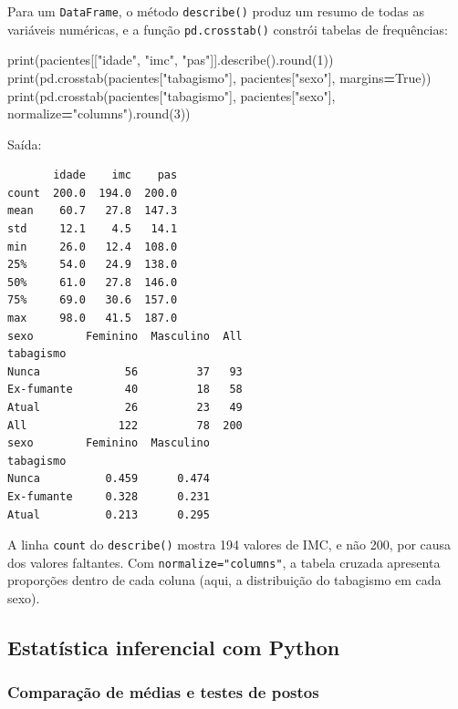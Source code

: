 \documentclass[
]{book}
\newenvironment{Shaded}{\begin{snugshade}}{\end{snugshade}}
\newcommand{\BuiltInTok}[1]{#1}
\newcommand{\DecValTok}[1]{\textcolor[rgb]{0.00,0.00,0.81}{#1}}
\newcommand{\NormalTok}[1]{#1}
\newcommand{\OperatorTok}[1]{\textcolor[rgb]{0.81,0.36,0.00}{\textbf{#1}}}
\newcommand{\StringTok}[1]{\textcolor[rgb]{0.31,0.60,0.02}{#1}}
\newcommand{\VariableTok}[1]{\textcolor[rgb]{0.00,0.00,0.00}{#1}}
\begin{document}
Para um \texttt{DataFrame}, o método \texttt{describe()} produz um resumo de todas as variáveis numéricas, e a função \texttt{pd.crosstab()} constrói tabelas de frequências:

\begin{Shaded}
\begin{Highlighting}[]
\BuiltInTok{print}\NormalTok{(pacientes[[}\StringTok{"idade"}\NormalTok{, }\StringTok{"imc"}\NormalTok{, }\StringTok{"pas"}\NormalTok{]].describe().}\BuiltInTok{round}\NormalTok{(}\DecValTok{1}\NormalTok{))}
\BuiltInTok{print}\NormalTok{(pd.crosstab(pacientes[}\StringTok{"tabagismo"}\NormalTok{], pacientes[}\StringTok{"sexo"}\NormalTok{], margins}\OperatorTok{=}\VariableTok{True}\NormalTok{))}
\BuiltInTok{print}\NormalTok{(pd.crosstab(pacientes[}\StringTok{"tabagismo"}\NormalTok{], pacientes[}\StringTok{"sexo"}\NormalTok{], normalize}\OperatorTok{=}\StringTok{"columns"}\NormalTok{).}\BuiltInTok{round}\NormalTok{(}\DecValTok{3}\NormalTok{))}
\end{Highlighting}
\end{Shaded}

Saída:

\begin{verbatim}
       idade    imc    pas
count  200.0  194.0  200.0
mean    60.7   27.8  147.3
std     12.1    4.5   14.1
min     26.0   12.4  108.0
25%     54.0   24.9  138.0
50%     61.0   27.8  146.0
75%     69.0   30.6  157.0
max     98.0   41.5  187.0
sexo        Feminino  Masculino  All
tabagismo                           
Nunca             56         37   93
Ex-fumante        40         18   58
Atual             26         23   49
All              122         78  200
sexo        Feminino  Masculino
tabagismo                      
Nunca          0.459      0.474
Ex-fumante     0.328      0.231
Atual          0.213      0.295
\end{verbatim}

A linha \texttt{count} do \texttt{describe()} mostra 194 valores de IMC, e não 200, por causa dos valores faltantes. Com \texttt{normalize="columns"}, a tabela cruzada apresenta proporções dentro de cada coluna (aqui, a distribuição do tabagismo em cada sexo).

\subsection{Estatística inferencial com Python}\label{estatuxedstica-inferencial-com-python}

\subsubsection{Comparação de médias e testes de postos}\label{comparauxe7uxe3o-de-muxe9dias-e-testes-de-postos}
\end{document}
